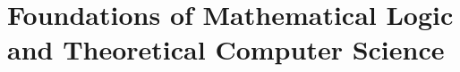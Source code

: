 \documentclass[../../book-en.tex]{subfiles}
\begin{document}
\chapter{Foundations of Mathematical Logic and Theoretical Computer Science}
\label{ch:2.3a-logic-tcs-en}















\end{document}
